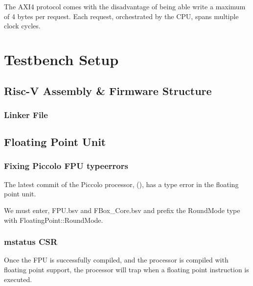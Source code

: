 \documentclass[a4paper,9pt]{report}
\begin{document}
The AXI4 protocol comes with the disadvantage of being able write a maximum of 4
bytes per request. Each request, orchestrated by the CPU, spans multiple clock cycles.

\section{Testbench Setup}
\subsection{Risc-V Assembly \& Firmware Structure}
\subsubsection{Linker File}

\subsection{Floating Point Unit}
\subsubsection{Fixing Piccolo FPU typeerrors}
The latest commit of the Piccolo processor, (), has a type error in the floating
point unit. 

We must enter, FPU.bsv and FBox\_Core.bsv and prefix the RoundMode type with FloatingPoint::RoundMode.





\subsubsection{mstatus CSR}
Once the FPU is successfully compiled, and the processor is compiled with
floating point support, the processor will trap when a floating point
instruction is executed.
\end{document}
